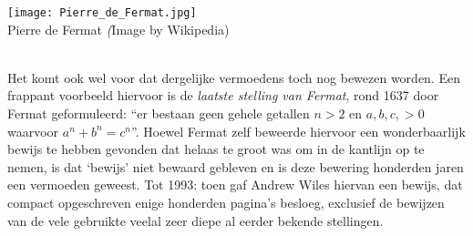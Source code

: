   \begin{marginfigure}
\texttt{[image: Pierre\_de\_Fermat.jpg]}\\
    Pierre de Fermat {\scriptsize\emph (Image by Wikipedia)}\\[3mm]
  \end{marginfigure}

\begin{aside}\textbf{}\\[2.5pt]
Het komt ook wel voor dat dergelijke vermoedens toch nog bewezen worden. Een frappant voorbeeld hiervoor is de \textit{laatste stelling van Fermat}, rond 1637 door Fermat geformuleerd: \enquote{er bestaan geen gehele getallen $n>2$ en $a,b,c,>0$ waarvoor $a^n+b^n=c^n$}. Hoewel Fermat zelf beweerde hiervoor een wonderbaarlijk bewijs te hebben gevonden dat helaas te groot was om in de kantlijn op te nemen, is dat `bewijs' niet bewaard gebleven en is deze bewering honderden jaren een vermoeden geweest. Tot 1993: toen gaf Andrew Wiles hiervan een bewijs, dat compact opgeschreven enige honderden pagina's besloeg, exclusief de bewijzen van de vele gebruikte veelal zeer diepe al eerder bekende stellingen.
\end{aside}

